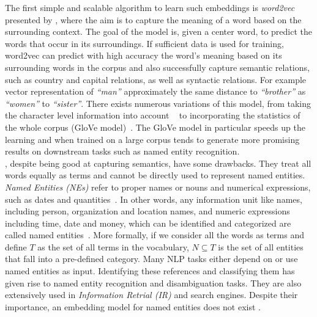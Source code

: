 \noindent
The first simple and scalable algorithm to learn such embeddings is \emph{word2vec} presented by , where the aim is to capture the meaning of a word based on the surrounding context. The goal of the model is, given a center word, to predict the words that occur in its surroundings. If sufficient data is used for training, word2vec can predict with high accuracy the word's meaning based on its surrounding words in the corpus and also successfully capture semantic relations, such as country and capital relations, as well as syntactic relations. For example vector representation of  \emph{``man''}  approximately the same distance to  \emph{``brother''} as \emph{``women''} to \emph{``sister''}. There exists numerous variations of this model, from taking the character level information into account ~ to incorporating the statistics of the whole corpus (GloVe model)~. The GloVe model in particular speeds up the learning and when trained on a large corpus tends to generate more promising results on downstream tasks such as named entity recognition.\\
, despite being good at capturing semantics, have some drawbacks.  They treat all words equally as terms and cannot be directly used to represent named entities. \emph{Named Entities (NEs)} refer to proper names or nouns and numerical
expressions, such as dates and quantities~. In other words, any information unit like names, including person,
organization and location names, and numeric expressions including time, date and money, which can be identified and categorized are called named entities~. More formally, if we consider all the words as terms and define $T$ as the set of all terms in the vocabulary, $N\subseteq T$ is the set of all entities that fall into a pre-defined category. Many NLP tasks either depend on or use named entities as input. Identifying these references and classifying them has given rise to named entity recognition and disambiguation tasks. They are also extensively used in \emph{Information Retrial (IR)} and search engines. Despite their importance, an embedding model for named entities does not exist . \\
